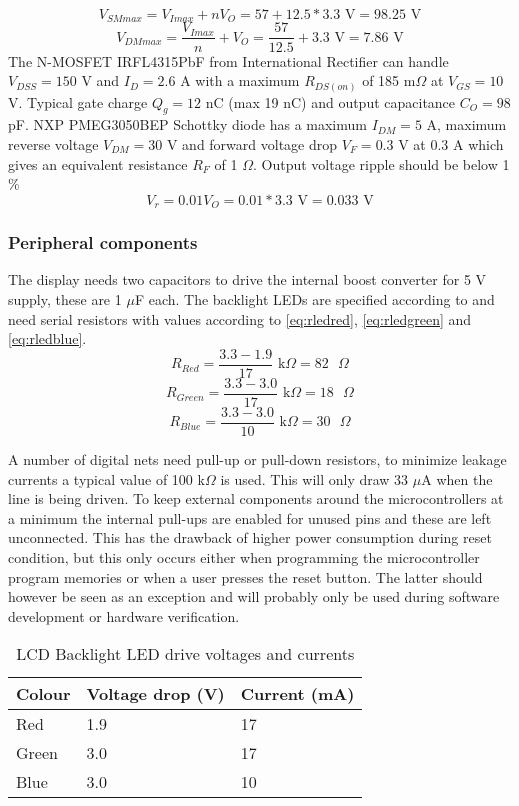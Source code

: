\begin{equation}
V_{SMmax} = V_{Imax} +nV_O = 57 + 12.5*3.3 \text{ V} = 98.25 \text{ V}
\end{equation}
\begin{equation}
V_{DMmax} = \frac{V_{Imax}}{n} + V_O = \frac{57}{12.5} + 3.3 \text{ V}
= 7.86 \text{ V}
\end{equation}
The N-MOSFET IRFL4315PbF from International Rectifier can handle
$V_{DSS}=150$ V and $I_D=2.6$ A with a maximum $R_{DS(on)}$ of 185
m$\Omega$ at $V_{GS}=10$ V. Typical gate charge $Q_g=12$ nC (max 19
nC) and output capacitance $C_O=98$ pF. NXP PMEG3050BEP Schottky diode
has a maximum $I_{DM}=5$ A, maximum reverse voltage $V_{DM}=30$ V and
forward voltage drop $V_F=0.3$ V at 0.3 A which gives an equivalent
resistance $R_F$ of 1 $\Omega$. Output voltage ripple should be below
1 \%
\begin{equation}
V_r=0.01V_O = 0.01*3.3 \text{ V} = 0.033 \text{ V}
\end{equation}



\subsubsection{Peripheral components}
The display needs two capacitors to drive the internal boost converter
for 5 V supply, these are 1 $\mu$F each. The backlight LEDs are
specified according to  and need serial
resistors with values according to \ref{eq:rledred}, \ref{eq:rledgreen}
and \ref{eq:rledblue}.
\begin{equation}
R_{Red} = \frac{3.3 - 1.9}{17} \text{ k$\Omega$} = 82 \text{ $\Omega$}
\label{eq:rledred}
\end{equation}
\begin{equation}
R_{Green} = \frac{3.3 - 3.0}{17} \text{ k$\Omega$} = 18 \text{ $\Omega$}
\label{eq:rledgreen}
\end{equation}
\begin{equation}
R_{Blue} = \frac{3.3 - 3.0}{10} \text{ k$\Omega$} = 30 \text{ $\Omega$}
\label{eq:rledblue}
\end{equation}

A number of digital nets need pull-up or pull-down resistors, to
minimize leakage currents a typical value of 100 k$\Omega$ is
used. This will only draw 33 $\mu$A when the line is being driven. To
keep external components around the microcontrollers at a minimum the
internal pull-ups are enabled for unused pins and these are left
unconnected. This has the drawback of higher power consumption during
reset condition, but this only occurs either when programming the
microcontroller program memories or when a user presses the reset
button. The latter should however be seen as an exception and will
probably only be used during software development or hardware
verification.


\begin{table}
\begin{tabular}{|l|l|l|}
\hline
Colour & Voltage drop (V) & Current (mA)\\
\hline
Red & 1.9 & 17\\
Green & 3.0 & 17\\
Blue & 3.0 & 10\\
\hline
\end{tabular}
\caption{LCD Backlight LED drive voltages and currents}
\label{tab:backlightleds}
\end{table}
